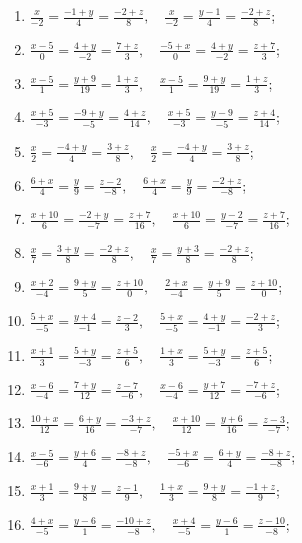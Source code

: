 	\vspace{10pt}
	\begin{enumerate}
		\setcounter{enumi}{\value{tasks}}

			\item \( \displaystyle \frac{x}{-2} = \frac{-1+y}{4} = \frac{-2+z}{8}, \quad \frac{x}{-2} = \frac{y-1}{4} = \frac{-2+z}{8} \);
			\item \( \displaystyle \frac{x-5}{0} = \frac{4+y}{-2} = \frac{7+z}{3}, \quad \frac{-5+x}{0} = \frac{4+y}{-2} = \frac{z+7}{3} \);
			\item \( \displaystyle \frac{x-5}{1} = \frac{y+9}{19} = \frac{1+z}{3}, \quad \frac{x-5}{1} = \frac{9+y}{19} = \frac{1+z}{3} \);
			\item \( \displaystyle \frac{x+5}{-3} = \frac{-9+y}{-5} = \frac{4+z}{14}, \quad \frac{x+5}{-3} = \frac{y-9}{-5} = \frac{z+4}{14} \);
			\item \( \displaystyle \frac{x}{2} = \frac{-4+y}{4} = \frac{3+z}{8}, \quad \frac{x}{2} = \frac{-4+y}{4} = \frac{3+z}{8} \);
			\item \( \displaystyle \frac{6+x}{4} = \frac{y}{9} = \frac{z-2}{-8}, \quad \frac{6+x}{4} = \frac{y}{9} = \frac{-2+z}{-8} \);
			\item \( \displaystyle \frac{x+10}{6} = \frac{-2+y}{-7} = \frac{z+7}{16}, \quad \frac{x+10}{6} = \frac{y-2}{-7} = \frac{z+7}{16} \);
			\item \( \displaystyle \frac{x}{7} = \frac{3+y}{8} = \frac{-2+z}{8}, \quad \frac{x}{7} = \frac{y+3}{8} = \frac{-2+z}{8} \);
			\item \( \displaystyle \frac{x+2}{-4} = \frac{9+y}{5} = \frac{z+10}{0}, \quad \frac{2+x}{-4} = \frac{y+9}{5} = \frac{z+10}{0} \);
			\item \( \displaystyle \frac{5+x}{-5} = \frac{y+4}{-1} = \frac{z-2}{3}, \quad \frac{5+x}{-5} = \frac{4+y}{-1} = \frac{-2+z}{3} \);
			\item \( \displaystyle \frac{x+1}{3} = \frac{5+y}{-3} = \frac{z+5}{6}, \quad \frac{1+x}{3} = \frac{5+y}{-3} = \frac{z+5}{6} \);
			\item \( \displaystyle \frac{x-6}{-4} = \frac{7+y}{12} = \frac{z-7}{-6}, \quad \frac{x-6}{-4} = \frac{y+7}{12} = \frac{-7+z}{-6} \);
			\item \( \displaystyle \frac{10+x}{12} = \frac{6+y}{16} = \frac{-3+z}{-7}, \quad \frac{x+10}{12} = \frac{y+6}{16} = \frac{z-3}{-7} \);
			\item \( \displaystyle \frac{x-5}{-6} = \frac{y+6}{4} = \frac{-8+z}{-8}, \quad \frac{-5+x}{-6} = \frac{6+y}{4} = \frac{-8+z}{-8} \);
			\item \( \displaystyle \frac{x+1}{3} = \frac{9+y}{8} = \frac{z-1}{9}, \quad \frac{1+x}{3} = \frac{9+y}{8} = \frac{-1+z}{9} \);
			\item \( \displaystyle \frac{4+x}{-5} = \frac{y-6}{1} = \frac{-10+z}{-8}, \quad \frac{x+4}{-5} = \frac{y-6}{1} = \frac{z-10}{-8} \);

		\setcounter{tasks}{\value{enumi}}
	\end{enumerate}

